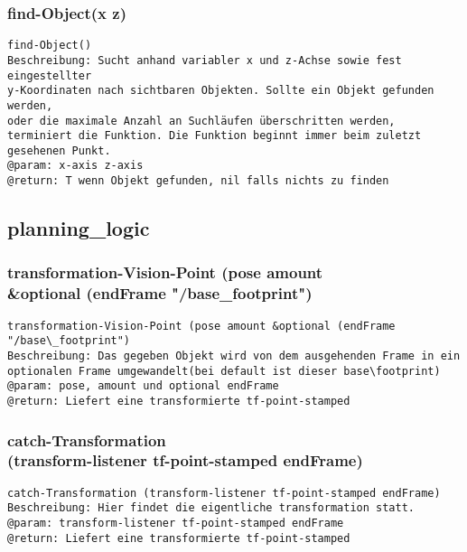 \documentclass{suturo}
\begin{document}
\subsubsection{find-Object(x z)}
\begin{verbatim}
find-Object()
Beschreibung: Sucht anhand variabler x und z-Achse sowie fest eingestellter
y-Koordinaten nach sichtbaren Objekten. Sollte ein Objekt gefunden werden,
oder die maximale Anzahl an Suchläufen überschritten werden,
terminiert die Funktion. Die Funktion beginnt immer beim zuletzt gesehenen Punkt.
@param: x-axis z-axis
@return: T wenn Objekt gefunden, nil falls nichts zu finden
\end{verbatim}



\subsection{planning\_logic}

\subsubsection{transformation-Vision-Point (pose amount\\
\&optional (endFrame "/base\_footprint")}
\begin{verbatim}
transformation-Vision-Point (pose amount &optional (endFrame "/base\_footprint")
Beschreibung: Das gegeben Objekt wird von dem ausgehenden Frame in ein optionalen Frame umgewandelt(bei default ist dieser base\footprint)
@param: pose, amount und optional endFrame
@return: Liefert eine transformierte tf-point-stamped
\end{verbatim}




\subsubsection{catch-Transformation \\
(transform-listener tf-point-stamped endFrame)}
\begin{verbatim}
catch-Transformation (transform-listener tf-point-stamped endFrame)
Beschreibung: Hier findet die eigentliche transformation statt.
@param: transform-listener tf-point-stamped endFrame
@return: Liefert eine transformierte tf-point-stamped
\end{verbatim}


\end{document}

